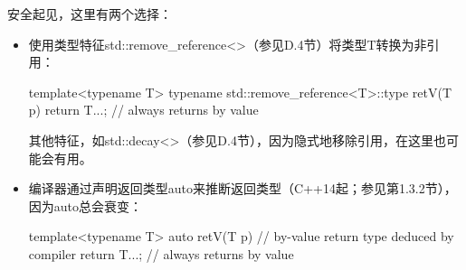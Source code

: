 安全起见，这里有两个选择：

\begin{itemize}
\item 
使用类型特征std::remove\_reference<>（参见D.4节）将类型T转换为非引用：

\begin{cpp}
template<typename T>
typename std::remove_reference<T>::type retV(T p) {
	return T{...}; // always returns by value
}
\end{cpp}

其他特征，如std::decay<>（参见D.4节），因为隐式地移除引用，在这里也可能会有用。

\item 
编译器通过声明返回类型auto来推断返回类型（C++14起；参见第1.3.2节），因为auto总会衰变：

\begin{cpp}
template<typename T>
auto retV(T p) { // by-value return type deduced by compiler
	return T{...}; // always returns by value
}
\end{cpp}

\end{itemize}


















